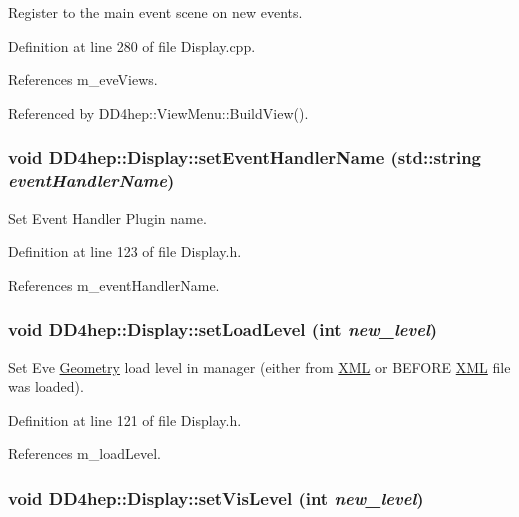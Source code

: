 Register to the main event scene on new events. 

Definition at line 280 of file Display.cpp.

References m\_\-eveViews.

Referenced by DD4hep::ViewMenu::BuildView().\hypertarget{class_d_d4hep_1_1_display_a41734ab371228987decf1ab66c989f56}{
\subsubsection[{setEventHandlerName}]{\setlength{\rightskip}{0pt plus 5cm}void DD4hep::Display::setEventHandlerName (std::string {\em eventHandlerName})}}
\label{class_d_d4hep_1_1_display_a41734ab371228987decf1ab66c989f56}


Set Event Handler Plugin name. 

Definition at line 123 of file Display.h.

References m\_\-eventHandlerName.\hypertarget{class_d_d4hep_1_1_display_a40be77ac29040ee1847af97871b78259}{
\subsubsection[{setLoadLevel}]{\setlength{\rightskip}{0pt plus 5cm}void DD4hep::Display::setLoadLevel (int {\em new\_\-level})}}
\label{class_d_d4hep_1_1_display_a40be77ac29040ee1847af97871b78259}


Set Eve \hyperlink{namespace_d_d4hep_1_1_geometry}{Geometry} load level in manager (either from \hyperlink{namespace_d_d4hep_1_1_x_m_l}{XML} or BEFORE \hyperlink{namespace_d_d4hep_1_1_x_m_l}{XML} file was loaded). 

Definition at line 121 of file Display.h.

References m\_\-loadLevel.\hypertarget{class_d_d4hep_1_1_display_a57cf9b4b15b4627ac264bc95583ace91}{
\subsubsection[{setVisLevel}]{\setlength{\rightskip}{0pt plus 5cm}void DD4hep::Display::setVisLevel (int {\em new\_\-level})}}
\label{class_d_d4hep_1_1_display_a57cf9b4b15b4627ac264bc95583ace91}


